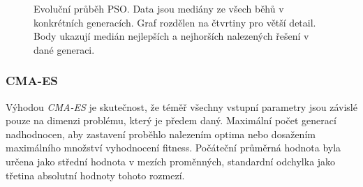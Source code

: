 \begin{figure}[H]
{\begin{tabular}{cc}
    \end{tabular}
    }
    \caption{Evoluční průběh PSO. Data jsou mediány ze všech běhů v konkrétních generacích. Graf rozdělen na čtvrtiny pro větší detail. Body ukazují medián nejlepších a nejhorších nalezených řešení v dané generaci.}
    \label{fg:bench:griewank:pso:evoProg}
\end{figure}

\subsubsection{CMA-ES}
Výhodou \emph{CMA-ES} je skutečnost, že téměř všechny vstupní parametry jsou závislé pouze na dimenzi problému, který je předem daný. Maximální počet generací nadhodnocen, aby zastavení proběhlo nalezením optima nebo dosažením maximálního množství vyhodnocení fitness. Počáteční průměrná hodnota byla určena jako střední hodnota v mezích proměnných, standardní odchylka jako třetina absolutní hodnoty tohoto rozmezí.

